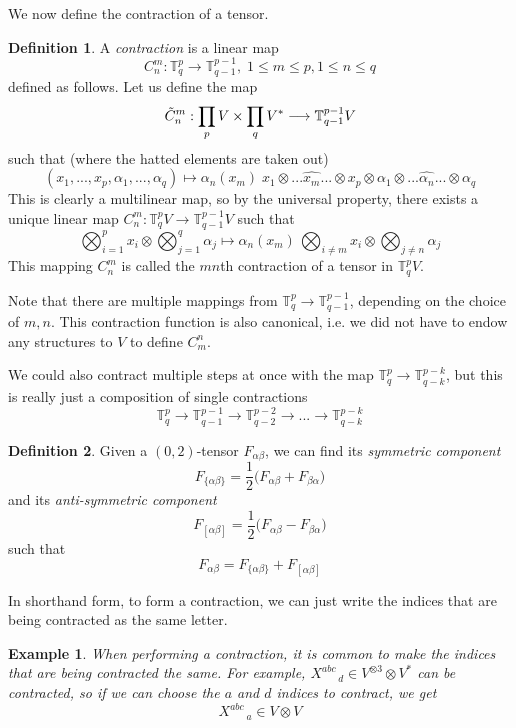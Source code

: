 \documentclass{article}
\newtheorem{example}{Example}[section]
\theoremstyle{remark}
\theoremstyle{definition}
\newtheorem{definition}{Definition}[section]
\begin{document}
We now define the contraction of a tensor. 

\begin{definition}
A \textit{contraction} is a linear map
\[C^m_n: \mathbb{T}^p_q \longrightarrow \mathbb{T}^{p-1}_{q-1}, \; 1 \leq m \leq p, 1 \leq n \leq q\]
defined as follows. Let us define the map 
\[\Tilde{C}^m_n: \prod_{p} V \times \prod_q V^* \longrightarrow \mathbb{T}^{p-1}_{q-1} V\]
such that (where the hatted elements are taken out)
\[ (x_1, ..., x_p, \alpha_1, ..., \alpha_q) \mapsto \alpha_n (x_m) \; x_1 \otimes ... \hat{x_m} ... \otimes x_p \otimes \alpha_1 \otimes ... \hat{\alpha_n} ... \otimes \alpha_q\]
This is clearly a multilinear map, so by the universal property, there exists a unique linear map $C^m_n: \mathbb{T}^p_q V \longrightarrow \mathbb{T}^{p-1}_{q-1} V$ such that 
\[ \bigotimes_{i=1}^p x_i \otimes \bigotimes_{j=1}^q \alpha_j \mapsto \alpha_n (x_m) \, \bigotimes_{i \neq m} x_i \otimes \bigotimes_{j \neq n} \alpha_j\]
This mapping $C^m_n$ is called the $m n$th contraction of a tensor in $\mathbb{T}^p_q V$. 
\end{definition}

Note that there are multiple mappings from $\mathbb{T}^p_q \longrightarrow \mathbb{T}^{p-1}_{q-1}$, depending on the choice of $m, n$. This contraction function is also canonical, i.e. we did not have to endow any structures to $V$ to define $C^n_m$. 

We could also contract multiple steps at once with the map $\mathbb{T}^p_q \longrightarrow \mathbb{T}^{p-k}_{q-k}$, but this is really just a composition of single contractions 
\[\mathbb{T}^p_q \longrightarrow \mathbb{T}^{p-1}_{q-1} \longrightarrow \mathbb{T}^{p-2}_{q-2} \longrightarrow ... \longrightarrow \mathbb{T}^{p-k}_{q-k} \]

\begin{definition}
Given a $(0, 2)$-tensor $F_{\alpha \beta}$, we can find its \textit{symmetric component}
\[ F_{ \{ \alpha \beta\}} = \frac{1}{2} \big(F_{\alpha \beta} + F_{\beta \alpha} \big)\]
and its \textit{anti-symmetric component}
\[ F_{ [ \alpha \beta]} = \frac{1}{2} \big(F_{\alpha \beta} - F_{\beta \alpha} \big)\]
such that 
\[ F_{\alpha \beta} = F_{ \{ \alpha \beta \}} + F_{[\alpha \beta]}\]
\end{definition}

In shorthand form, to form a contraction, we can just write the indices that are being contracted as the same letter. 

\begin{example}
When performing a contraction, it is common to make the indices that are being contracted the same. For example, $X^{a b c}_{\;\;\;\;\;\; d} \in V^{\otimes 3} \otimes V^*$ can be contracted, so if we can choose the $a$ and $d$ indices to contract, we get 
\[X^{a b c}_{\;\;\;\;\;\; a} \in V \otimes V\]
\end{example}
\end{document}
